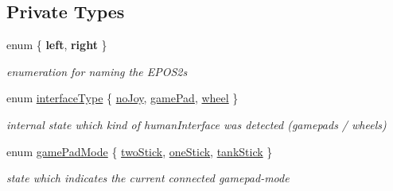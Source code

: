 \subsection*{Private Types}
\begin{DoxyCompactItemize}
\item 
enum \{ {\bfseries left}, 
{\bfseries right}
 \}
\begin{DoxyCompactList}\small\item\em enumeration for naming the E\-P\-O\-S2s \end{DoxyCompactList}\item 
enum \hyperlink{classSampleMoving_ad495d48e1ec2093a36601548bfad852d}{interface\-Type} \{ \hyperlink{classSampleMoving_ad495d48e1ec2093a36601548bfad852da4ba2232b260456be1ed027bb3bde6b0d}{no\-Joy}, 
\hyperlink{classSampleMoving_ad495d48e1ec2093a36601548bfad852dafd942ead788c486efb6c26363e68acff}{game\-Pad}, 
\hyperlink{classSampleMoving_ad495d48e1ec2093a36601548bfad852da003251f50ad3e22d0ab96167b517d017}{wheel}
 \}
\begin{DoxyCompactList}\small\item\em internal state which kind of human\-Interface was detected (gamepads / wheels) \end{DoxyCompactList}\item 
enum \hyperlink{classSampleMoving_ad45933bb8e660772ea25747d3446bd8a}{game\-Pad\-Mode} \{ \hyperlink{classSampleMoving_ad45933bb8e660772ea25747d3446bd8aa34ec1e09ac95890b7840157db35fe828}{two\-Stick}, 
\hyperlink{classSampleMoving_ad45933bb8e660772ea25747d3446bd8aaf949a715587ed74b5cb1f8199e3f369d}{one\-Stick}, 
\hyperlink{classSampleMoving_ad45933bb8e660772ea25747d3446bd8aaa424c4ac1573cab2407925cf755474ba}{tank\-Stick}
 \}
\begin{DoxyCompactList}\small\item\em state which indicates the current connected gamepad-\/mode \end{DoxyCompactList}\end{DoxyCompactItemize}
